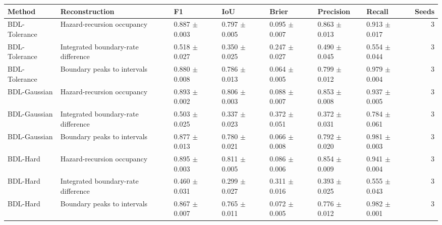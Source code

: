 \begin{tabular}{lllllllr}
\toprule
Method & Reconstruction & F1 & IoU & Brier & Precision & Recall & Seeds \\
\midrule
BDL-Tolerance & Hazard-recursion occupancy & 0.887 $\pm$ 0.003 & 0.797 $\pm$ 0.005 & 0.095 $\pm$ 0.007 & 0.863 $\pm$ 0.013 & 0.913 $\pm$ 0.017 & 3 \\
BDL-Tolerance & Integrated boundary-rate difference & 0.518 $\pm$ 0.027 & 0.350 $\pm$ 0.025 & 0.247 $\pm$ 0.027 & 0.490 $\pm$ 0.045 & 0.554 $\pm$ 0.044 & 3 \\
BDL-Tolerance & Boundary peaks to intervals & 0.880 $\pm$ 0.008 & 0.786 $\pm$ 0.013 & 0.064 $\pm$ 0.005 & 0.799 $\pm$ 0.012 & 0.979 $\pm$ 0.004 & 3 \\
BDL-Gaussian & Hazard-recursion occupancy & 0.893 $\pm$ 0.002 & 0.806 $\pm$ 0.003 & 0.088 $\pm$ 0.007 & 0.853 $\pm$ 0.008 & 0.937 $\pm$ 0.005 & 3 \\
BDL-Gaussian & Integrated boundary-rate difference & 0.503 $\pm$ 0.025 & 0.337 $\pm$ 0.023 & 0.372 $\pm$ 0.051 & 0.372 $\pm$ 0.031 & 0.784 $\pm$ 0.061 & 3 \\
BDL-Gaussian & Boundary peaks to intervals & 0.877 $\pm$ 0.013 & 0.780 $\pm$ 0.021 & 0.066 $\pm$ 0.008 & 0.792 $\pm$ 0.020 & 0.981 $\pm$ 0.003 & 3 \\
BDL-Hard & Hazard-recursion occupancy & 0.895 $\pm$ 0.003 & 0.811 $\pm$ 0.005 & 0.086 $\pm$ 0.006 & 0.854 $\pm$ 0.009 & 0.941 $\pm$ 0.004 & 3 \\
BDL-Hard & Integrated boundary-rate difference & 0.460 $\pm$ 0.031 & 0.299 $\pm$ 0.027 & 0.311 $\pm$ 0.016 & 0.393 $\pm$ 0.025 & 0.555 $\pm$ 0.043 & 3 \\
BDL-Hard & Boundary peaks to intervals & 0.867 $\pm$ 0.007 & 0.765 $\pm$ 0.011 & 0.072 $\pm$ 0.005 & 0.776 $\pm$ 0.012 & 0.982 $\pm$ 0.001 & 3 \\
\bottomrule
\end{tabular}
